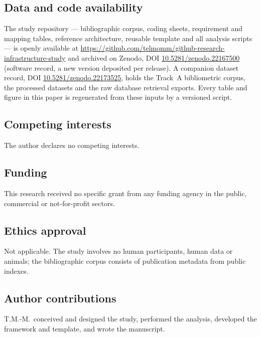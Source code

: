 \documentclass[pdflatex,sn-mathphys-num]{sn-jnl}%
\begin{document}
\subsection*{Data and code availability}\label{sec:data-availability}
The study repository --- bibliographic corpus, coding sheets, requirement and mapping tables, reference architecture, reusable template and all analysis scripts --- is openly available at \url{https://github.com/telmomm/github-research-infrastructure-study} and archived on Zenodo, DOI \href{https://doi.org/10.5281/zenodo.22167500}{10.5281/zenodo.22167500} (software record, a new version deposited per release). A companion dataset record, DOI \href{https://doi.org/10.5281/zenodo.22173525}{10.5281/zenodo.22173525}, holds the Track~A bibliometric corpus, the processed datasets and the raw database retrieval exports. Every table and figure in this paper is regenerated from these inputs by a versioned script.

\subsection*{Competing interests}
The author declares no competing interests.

\subsection*{Funding}
This research received no specific grant from any funding agency in the public, commercial or not-for-profit sectors.

\subsection*{Ethics approval}
Not applicable. The study involves no human participants, human data or animals; the bibliographic corpus consists of publication metadata from public indexes.

\subsection*{Author contributions}
T.M.-M.\ conceived and designed the study, performed the analysis, developed the framework and template, and wrote the manuscript.



\end{document}
